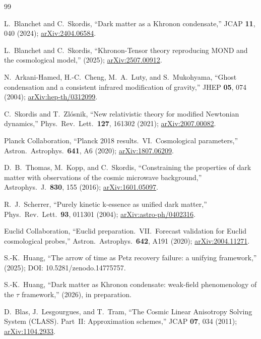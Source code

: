 \documentclass[prd,twocolumn,superscriptaddress,longbibliography,floatfix]{revtex4-2}
\begin{document}
\begin{thebibliography}{99}

L.~Blanchet and C.~Skordis,
``Dark matter as a Khronon condensate,''
JCAP \textbf{11}, 040 (2024);
\href{https://arxiv.org/abs/2404.06584}{arXiv:2404.06584}.

L.~Blanchet and C.~Skordis,
``Khronon-Tensor theory reproducing MOND and the cosmological model,''
(2025);
\href{https://arxiv.org/abs/2507.00912}{arXiv:2507.00912}.

N.~Arkani-Hamed, H.-C.~Cheng, M.~A.~Luty,
and S.~Mukohyama,
``Ghost condensation and a consistent infrared
modification of gravity,''
JHEP \textbf{05}, 074 (2004);
\href{https://arxiv.org/abs/hep-th/0312099}{arXiv:hep-th/0312099}.

C.~Skordis and T.~Zl\'{o}snik,
``New relativistic theory for modified Newtonian
dynamics,''
Phys.\ Rev.\ Lett.\ \textbf{127}, 161302 (2021);
\href{https://arxiv.org/abs/2007.00082}{arXiv:2007.00082}.

Planck Collaboration,
``Planck 2018 results.\ VI.\ Cosmological
parameters,''
Astron.\ Astrophys.\ \textbf{641}, A6 (2020);
\href{https://arxiv.org/abs/1807.06209}{arXiv:1807.06209}.

D.~B.~Thomas, M.~Kopp, and C.~Skordis,
``Constraining the properties of dark matter with
observations of the cosmic microwave background,''
Astrophys.\ J.\ \textbf{830}, 155 (2016);
\href{https://arxiv.org/abs/1601.05097}{arXiv:1601.05097}.

R.~J.~Scherrer,
``Purely kinetic k-essence as unified dark matter,''
Phys.\ Rev.\ Lett.\ \textbf{93}, 011301 (2004);
\href{https://arxiv.org/abs/astro-ph/0402316}{arXiv:astro-ph/0402316}.

Euclid Collaboration,
``Euclid preparation.\ VII.\ Forecast
validation for Euclid cosmological probes,''
Astron.\ Astrophys.\ \textbf{642}, A191 (2020);
\href{https://arxiv.org/abs/2004.11271}{arXiv:2004.11271}.

S.-K.~Huang,
``The arrow of time as Petz recovery failure:
a unifying framework,''
(2025);
DOI: 10.5281/zenodo.14775757.

S.-K.~Huang,
``Dark matter as Khronon condensate: weak-field
phenomenology of the $\tau$ framework,''
(2026), in preparation.

D.~Blas, J.~Lesgourgues, and T.~Tram,
``The Cosmic Linear Anisotropy Solving System (CLASS).
Part~II: Approximation schemes,''
JCAP \textbf{07}, 034 (2011);
\href{https://arxiv.org/abs/1104.2933}{arXiv:1104.2933}.

\end{thebibliography}
\end{document}
